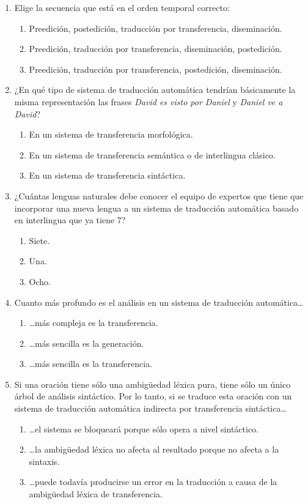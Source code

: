 \begin{enumerate}
\item Elige la secuencia que está en el orden temporal correcto: \begin{enumerate} \item Preedición, postedición, traducción por transferencia, diseminación. \item Preedición, traducción por transferencia, diseminación, postedición. \item Preedición, traducción por transferencia, postedición, diseminación. \end{enumerate} 

\item ¿En qué tipo de sistema de traducción automática tendrían básicamente la misma representación las frases \emph{David es visto por Daniel} y \emph{Daniel ve a David}? \begin{enumerate} \item En un sistema de transferencia morfológica. \item En un sistema de transferencia semántica o de interlingua clásico. \item En un sistema de transferencia sintáctica. \end{enumerate} 

\item ¿Cuántas lenguas naturales debe conocer el equipo de expertos que tiene que incorporar una nueva lengua a un sistema de traducción automática basado en interlingua que ya tiene 7? \begin{enumerate} \item Siete. \item Una. \item Ocho. \end{enumerate} 

\item Cuanto más profundo es el análisis en un sistema de traducción automática{\ldots} \begin{enumerate} \item {\ldots}más compleja es la transferencia. \item {\ldots}más sencilla es la generación. \item {\ldots}más sencilla es la transferencia. \end{enumerate} 

\item Si una oración tiene sólo una ambigüedad léxica pura, tiene sólo un único árbol de análisis sintáctico. Por lo tanto, si se traduce esta oración con un sistema de traducción automática indirecta por transferencia sintáctica{\ldots} \begin{enumerate} \item {\ldots}el sistema se bloqueará porque sólo opera a nivel sintáctico. \item {\ldots}la ambigüedad léxica no afecta al resultado porque no afecta a la sintaxis. \item {\ldots}puede todavía producirse un error en la traducción a causa de la ambigüedad léxica de transferencia. \end{enumerate} 


\end{enumerate}

